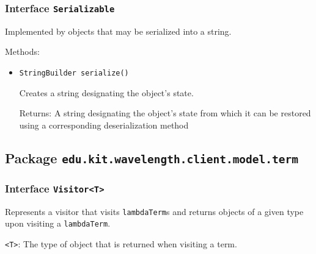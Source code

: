 \subsubsection{Interface \texttt{Serializable}}
\label{type:edu.kit.wavelength.client.model.serialization.Serializable}
Implemented by objects that may be serialized into a string.

Methods:
\begin{itemize}
\item \texttt{StringBuilder serialize()}

Creates a string designating the object's state.

Returns: A string designating the object's state from which it can be restored
         using a corresponding deserialization method

\end{itemize}

\subsection{Package \lstinline{edu.kit.wavelength.client.model.term}}
\label{pkg:edu.kit.wavelength.client.model.term}


\subsubsection{Interface \texttt{Visitor<T>}}
\label{type:edu.kit.wavelength.client.model.term.Visitor}
Represents a visitor that visits \texttt{lambdaTerm}s and returns objects of a
 given type upon visiting a \texttt{lambdaTerm}.

\texttt{<T>}: The type of object that is returned when visiting a term.


